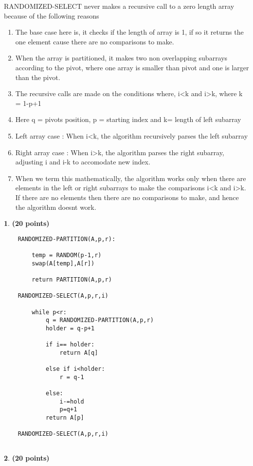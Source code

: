 \documentclass[11pt]{article}
\theoremstyle{definition}
\newtheorem{prob}{}
\newcommand{\solution}{\medskip\noindent{\color{DarkBlue}\textbf{Solution:}}}
\begin{document}
RANDOMIZED-SELECT never makes a recursive call to a zero length array because of the following reasons
\begin{enumerate}
    \item The base case here is, it checks if the length of array is 1, if so it returns the one element cause there are no comparisons to make.
    \item When the array is partitioned, it makes two non overlapping subarrays according to the pivot, where one array is smaller than pivot and one is larger than the pivot.
    \item The recursive calls are made on the conditions where, i<k and i>k, where k = 1-p+1
    \item Here q = pivots position, p = starting index and k= length of left subarray
    \item Left array case : When i<k, the algorithm recursively parses the left subarray
    \item Right array case : When i>k, the algorithm parses the right subarray, adjusting i and i-k to accomodate new index.
    \item When we term this mathematically, the algorithm works only when there are elements in the left or right subarrays to make the comparisons i<k and i>k. If there are no elements then there are no comparisons to make, and hence the algorithm doesnt work.
\end{enumerate}

\begin{prob} \textbf{(20 points)}
\end{prob}

\solution

\begin{verbatim}
    RANDOMIZED-PARTITION(A,p,r):

        temp = RANDOM(p-1,r)
        swap(A[temp],A[r])

        return PARTITION(A,p,r)
    
    RANDOMIZED-SELECT(A,p,r,i)

        while p<r:
            q = RANDOMIZED-PARTITION(A,p,r)
            holder = q-p+1

            if i== holder:
                return A[q]
            
            else if i<holder:
                r = q-1
            
            else:
                i-=hold
                p=q+1
            return A[p]
    
    RANDOMIZED-SELECT(A,p,r,i)
    
\end{verbatim}
\begin{prob} \textbf{(20 points)}
\end{prob}
\end{document}
